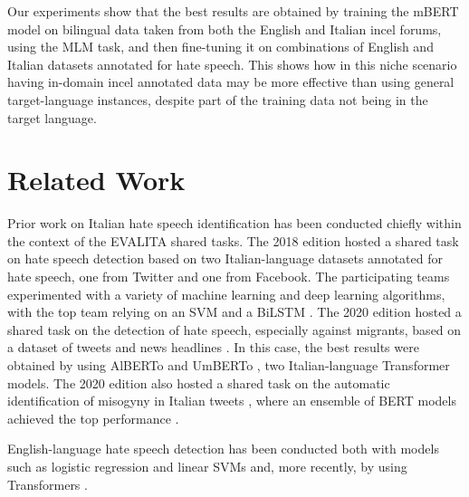 \documentclass[11pt]{article}
\newcommand{\todoP}[1]{\todo[color=red]{P: #1}}
\begin{document}
Our experiments show that the best results are obtained by training the mBERT model on bilingual data taken from both the English and Italian incel forums, using the MLM task, and then fine-tuning it on combinations of English and Italian datasets annotated for hate speech. This shows how in this niche scenario having in-domain incel annotated data may be more effective than using general target-language instances, despite part of the training data not being in the target language.


\section{Related Work}

Prior work on Italian hate speech identification has been conducted chiefly within the context of the EVALITA shared tasks. The 2018 edition hosted a shared task on hate speech detection \cite{boscoOverviewEVALITA2018} based on two Italian-language datasets annotated for hate speech, one from Twitter and one from Facebook. The participating teams experimented with a variety of machine learning and deep learning algorithms, with the top team relying on an SVM and a BiLSTM \cite{cimino2018multi}. The 2020 edition hosted a shared task on the detection of hate speech, especially against migrants, based on a dataset of tweets and news headlines \cite{basileEVALITA2020Overview}. In this case, the best results were obtained by using AlBERTo \cite{PolignanoEtAlCLIC2019} and UmBERTo \cite{musixmatch-2020-umberto}, two Italian-language Transformer models. The 2020 edition also hosted a shared task on the automatic identification of misogyny in Italian tweets \cite{fersiniAMIEVALITA2020Automatic2020}, where an ensemble of BERT models achieved the top performance \cite{mutiUniBOAMIMultiClass2020}.

English-language hate speech detection has been conducted both with models such as logistic regression and linear SVMs \cite{davidson-2017-automated-hate} and, more recently, by using Transformers \cite{mathew2021hatexplain}.
\end{document}
